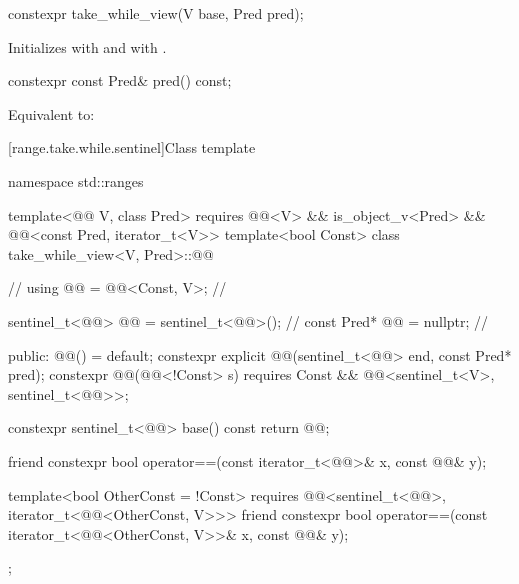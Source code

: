 %
\begin{itemdecl}
constexpr take_while_view(V base, Pred pred);
\end{itemdecl}

\begin{itemdescr}
\pnum
\effects
Initializes  with  and
 with .
\end{itemdescr}

%
\begin{itemdecl}
constexpr const Pred& pred() const;
\end{itemdecl}

\begin{itemdescr}
\pnum
\effects
Equivalent to: 
\end{itemdescr}

[range.take.while.sentinel]{Class template }

%
\begin{codeblock}
namespace std::ranges {
  template<@@ V, class Pred>
    requires @@<V> && is_object_v<Pred> &&
             @@<const Pred, iterator_t<V>>
  template<bool Const>
  class take_while_view<V, Pred>::@@ {            // \expos
    using @@ = @@<Const, V>;                 // \expos

    sentinel_t<@@> @@ = sentinel_t<@@>();         // \expos
    const Pred* @@ = nullptr;                        // \expos

  public:
    @@() = default;
    constexpr explicit @@(sentinel_t<@@> end, const Pred* pred);
    constexpr @@(@@<!Const> s)
      requires Const && @@<sentinel_t<V>, sentinel_t<@@>>;

    constexpr sentinel_t<@@> base() const { return @@; }

    friend constexpr bool operator==(const iterator_t<@@>& x, const @@& y);

    template<bool OtherConst = !Const>
      requires @@<sentinel_t<@@>, iterator_t<@@<OtherConst, V>>>
    friend constexpr bool operator==(const iterator_t<@@<OtherConst, V>>& x,
                                     const @@& y);
  };
}
\end{codeblock}

